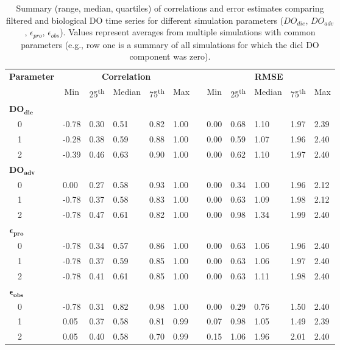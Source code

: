 \documentclass[letterpaper,12pt,oneside]{article}\usepackage[]{graphicx}\usepackage[]{color}
\begin{document}
%
\begin{table}[h]
\caption{Summary (range, median, quartiles) of correlations and error estimates comparing filtered and biological \ac{DO} time series for different simulation parameters ($DO_{die}$, $DO_{adv}$, $\epsilon_{pro}$, $\epsilon_{obs}$).  Values represent averages from multiple simulations with common parameters (e.g., row one is a summary of all simulations for which the diel \ac{DO} component was zero).\label{tab:dtd_perf1}} 
\begin{center}
\begin{tabular}{llllllclllll}
\hline\hline
\multicolumn{1}{l}{\bfseries Parameter}&\multicolumn{5}{c}{\bfseries Correlation}&\multicolumn{1}{c}{\bfseries }&\multicolumn{5}{c}{\bfseries RMSE}\tabularnewline
\cline{2-6} \cline{8-12}
\multicolumn{1}{l}{}&\multicolumn{1}{c}{Min}&\multicolumn{1}{c}{25\textsuperscript{th}}&\multicolumn{1}{c}{Median}&\multicolumn{1}{c}{75\textsuperscript{th}}&\multicolumn{1}{c}{Max}&\multicolumn{1}{c}{}&\multicolumn{1}{c}{Min}&\multicolumn{1}{c}{25\textsuperscript{th}}&\multicolumn{1}{c}{Median}&\multicolumn{1}{c}{75\textsuperscript{th}}&\multicolumn{1}{c}{Max}\tabularnewline
\hline
{\bfseries $\boldsymbol{DO_{die}}$}&&&&&&&&&&&\tabularnewline
~~0&-0.78&0.30&0.51&0.82&1.00&&0.00&0.68&1.10&1.97&2.39\tabularnewline
~~1&-0.28&0.38&0.59&0.88&1.00&&0.00&0.59&1.07&1.96&2.40\tabularnewline
~~2&-0.39&0.46&0.63&0.90&1.00&&0.00&0.62&1.10&1.97&2.40\tabularnewline
\hline
{\bfseries $\boldsymbol{DO_{adv}}$}&&&&&&&&&&&\tabularnewline
~~0& 0.00&0.27&0.58&0.93&1.00&&0.00&0.34&1.00&1.96&2.12\tabularnewline
~~1&-0.78&0.37&0.58&0.83&1.00&&0.00&0.63&1.09&1.98&2.12\tabularnewline
~~2&-0.78&0.47&0.61&0.82&1.00&&0.00&0.98&1.34&1.99&2.40\tabularnewline
\hline
{\bfseries $\boldsymbol{\epsilon_{pro}}$}&&&&&&&&&&&\tabularnewline
~~0&-0.78&0.34&0.57&0.86&1.00&&0.00&0.63&1.06&1.96&2.40\tabularnewline
~~1&-0.78&0.37&0.59&0.85&1.00&&0.00&0.63&1.06&1.97&2.40\tabularnewline
~~2&-0.78&0.41&0.61&0.85&1.00&&0.00&0.63&1.11&1.98&2.40\tabularnewline
\hline
{\bfseries $\boldsymbol{\epsilon_{obs}}$}&&&&&&&&&&&\tabularnewline
~~0&-0.78&0.31&0.82&0.98&1.00&&0.00&0.29&0.76&1.50&2.40\tabularnewline
~~1& 0.05&0.37&0.58&0.81&0.99&&0.07&0.98&1.05&1.49&2.39\tabularnewline
~~2& 0.05&0.40&0.58&0.70&0.99&&0.15&1.06&1.96&2.01&2.40\tabularnewline
\hline
\end{tabular}
\end{center}
\end{table}
\end{document}
